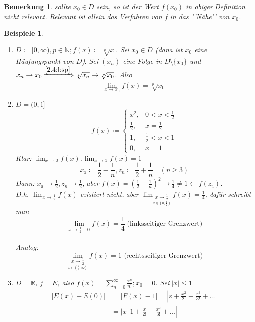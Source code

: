 \documentclass[titlepage,ngerman,a4paper,headsepline]{scrartcl}
\newcommand{\N}{\mathbb{N}}
\newcommand{\R}{\mathbb{R}}
\theoremstyle{named}
\theoremstyle{dotless}
\newtheorem*{beispiele}{Beispiele}
\newtheorem*{bemerkung}{Bemerkung}
\begin{document}
\begin{bemerkung}
	sollte $x_{0} \in D$ sein, so ist der Wert $f(x_{0})$ in obiger Definition nicht relevant. Relevant ist allein das Verfahren von $f$ in das "'Nähe"' von $x_{0}$.	
\end{bemerkung}

 
\begin{beispiele} ~\
	\begin{enumerate}
		\item $D \coloneqq [0, \infty), p \in \N; f(x) \coloneqq \sqrt[p]{x}$. Sei $x_{0} \in D$ (dann ist $x_{0}$ eine Häufungspunkt von $D$). Sei $(x_{n})$ eine Folge in $D \setminus \{ x_{0} \}$ und $x_{n} \rightarrow x_{0} \xRightarrow[]{\ref{2.4:bsp}} \sqrt[p]{x_{n}} \rightarrow \sqrt[p]{x_{0}}$. Also
			$$ \lim_{x \rightarrow x_{0}} f(x) = \sqrt[p]{x_{0}} $$
		\item $D = (0, 1]$
			$$ f(x) \coloneqq \begin{cases} x^{2}, & 0 < x < \frac{1}{2} \\ \frac{1}{2}, & x = \frac{1}{2} \\ 1, & \frac{1}{2} < x < 1 \\ 0, & x = 1 \end{cases} $$
			Klar: $\lim_{x \rightarrow 0} f(x), \lim_{x \rightarrow 1} f(x) = 1$
			$$ x_{n} \coloneqq \frac{1}{2} - \frac{1}{n}, z_{n} \coloneqq \frac{1}{2} + \frac{1}{n} \quad (n \geq 3) $$
			Dann: $x_{n} \rightarrow \frac{1}{2}, z_{n} \rightarrow \frac{1}{2}$, aber $f(x) = \left( \frac{1}{2} - \frac{1}{n} \right)^{2} \rightarrow \frac{1}{4} \neq 1 \leftarrow f(z_{n})$. \\
			D.h. $\lim_{x \rightarrow \frac{1}{2}} f(x)$ existiert nicht, aber $\lim_{\underset{x \in (0, \frac{1}{2})}{x \rightarrow \frac{1}{2}}} f(x) = \frac{1}{4}$, dafür schreibt man 
			$$ \lim_{x \rightarrow \frac{1}{2}-0} f(x) = \frac{1}{4} \text{ (linksseitiger Grenzwert)} $$ \\
			Analog: 
			$$ \lim_{\underset{x \in (\frac{1}{2}, \infty)}{x \rightarrow \frac{1}{2}}} f(x) = 1 \text{ (rechtsseitiger Grenzwert)} $$ 
		\item $D = \R$, $f = E$, also $f(x) = \sum_{n=0}^{\infty} \frac{x^{n}}{n!}; x_{0} = 0$. Sei $|x| \leq 1$
			\begin{align*}
				|E(x) - E(0)| & = |E(x) - 1| = |x + \frac{x^{2}}{2!} + \frac{x^{3}}{3!} + \dotsc | \\
				& = |x| \left| 1 + \frac{x}{2!} + \frac{x^{2}}{3!} + \dotsc \right| \\

\end{align*}
\end{enumerate}
\end{beispiele}
\end{document}
